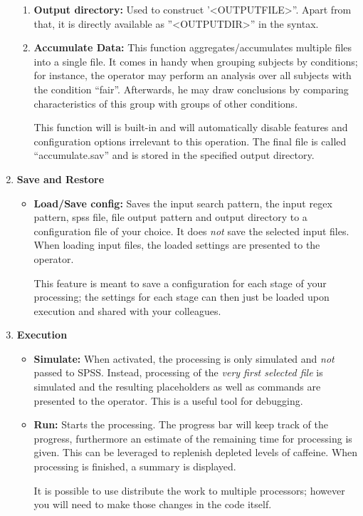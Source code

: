 \documentclass[]{article}
\newcommand{\ph}[1]{{\textless}#1{\textgreater}}
\begin{document}
\begin{enumerate}
\begin{enumerate}
	\item \textbf{Output directory:} Used to construct '\ph{OUTPUTFILE}''. Apart from that, it is directly available as ''\ph{OUTPUTDIR}'' in the syntax. 
		
	\item \textbf{Accumulate Data:} This function aggregates/accumulates multiple files into a single file. It comes in handy when grouping subjects by conditions; for instance, the operator may perform an analysis over all subjects with the condition ``fair''. Afterwards, he may draw conclusions by comparing characteristics of this group with groups of other conditions. 
	
	This function will is built-in and will automatically disable features and configuration options irrelevant to this operation. The final file is called ``accumulate.sav'' and is stored in the specified output directory. 
\end{enumerate}
	\item \textbf{Save and Restore}
	\begin{itemize}
	\item \textbf{Load/Save config:} Saves the input search pattern, the input regex pattern, spss file, file output pattern and output directory to a configuration file of your choice. It does \textit{not} save the selected input files. When loading input files, the loaded settings are presented to the operator. 
	
	This feature is meant to save a configuration for each stage of your processing; the settings for each stage can then just be loaded upon execution and shared with your colleagues. 
	
\end{itemize}

	\item \textbf{Execution}
\begin{itemize}
	\item  \textbf{Simulate:} When activated, the processing is only simulated and \textit{not} passed to SPSS. Instead, processing of the \textit{very first selected file} is simulated and the resulting placeholders as well as commands are presented to the operator. This is a useful tool for debugging. 
	
	\item \textbf{Run:} Starts the processing. The progress bar will keep track of the progress, furthermore an estimate of the remaining time for processing is given. This can be leveraged to replenish depleted levels of caffeine.  
	When processing is finished, a summary is displayed. 
	
	{\small It is possible to use distribute the work to multiple processors; however you will need to make those changes in the code itself. }
\end{itemize}

\end{enumerate}
\end{document}
